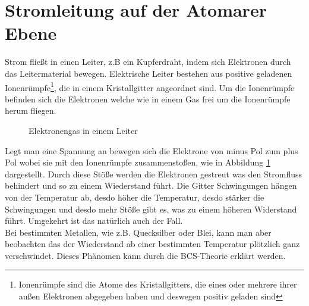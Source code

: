 \section{Stromleitung auf der Atomarer Ebene}
Strom fließt in einen Leiter, z.B ein Kupferdraht, indem sich Elektronen durch das Leitermaterial
bewegen. Elektrische Leiter bestehen aus positive geladenen Ionenrümpfe\footnote{Ionenrümpfe sind die Atome des Kristallgitters, die eines oder mehrere ihrer außen Elektronen abgegeben haben und deswegen positiv geladen sind}, die in einem Kristallgitter angeordnet sind. Um 
die Ionenrümpfe befinden sich die Elektronen welche wie in einem Gas frei um die Ionenrümpfe herum fliegen.


\begin{figure}[h]
    
    \centering
    \caption{Elektronengas in einem Leiter\label{fig:Elektronengas}}
\end{figure}
Legt man eine Spannung an bewegen sich die Elektrone von minus Pol zum plus Pol 
wobei sie mit den Ionenrümpfe zusammenstoßen, wie in Abbildung \ref{fig:Elektronengas} dargestellt.
Durch diese Stöße werden die Elektronen gestreut was den Stromfluss behindert und so zu einem Wiederstand führt. Die Gitter Schwingungen 
hängen von der Temperatur ab, desdo höher die Temperatur, desdo stärker die Schwingungen und desdo mehr Stöße gibt es, was zu einem höheren
Widerstand führt. Umgekehrt ist das natürlich 
auch der Fall. \\

Bei bestimmten Metallen, wie z.B. Quecksilber oder Blei, kann man aber beobachten das der Wiederstand ab einer bestimmten 
Temperatur plötzlich ganz verschwindet. Dieses Phänomen kann durch die BCS-Theorie erklärt werden.